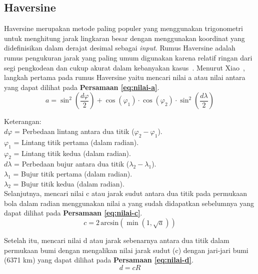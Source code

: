 \subsection{Haversine}
Haversine merupakan metode paling populer yang menggunakan trigonometri untuk menghitung jarak lingkaran besar dengan menggunakan koordinat yang didefinisikan dalam derajat desimal sebagai \textit{input}. Rumus Haversine adalah rumus pengukuran jarak yang paling umum digunakan karena relatif ringan dari segi pengkodean dan cukup akurat dalam kebanyakan kasus~\cite{learning2019joel}. Menurut Xiao~\cite{gis2015xiao}, langkah pertama pada rumus Haversine yaitu mencari nilai a atau nilai antara yang dapat dilihat pada \textbf{Persamaan \ref{eq:nilai-a}}.
\begin{equation}
    a = \sin^2 \left( \frac{d\varphi}{2} \right) + \cos(\varphi_1) \cdot \cos(\varphi_2) \cdot \sin^2 \left( \frac{d\lambda}{2} \right)
\label{eq:nilai-a}
\end{equation}


\noindent Keterangan:
\\
$d\varphi$ = Perbedaan lintang antara dua titik ($\varphi_2 - \varphi_1$).
\\
$\varphi_1$ = Lintang titik pertama (dalam radian).
\\
$\varphi_2$ = Lintang titik kedua (dalam radian).
\\
$d\lambda$ = Perbedaan bujur antara dua titik ($\lambda_2 - \lambda_1$).
\\
$\lambda_1$ = Bujur titik pertama (dalam radian).
\\
$\lambda_2$ = Bujur titik kedua (dalam radian).
\\

Selanjutnya, mencari nilai c atau jarak sudut antara dua titik pada permukaan bola dalam radian menggunakan nilai a yang sudah didapatkan sebelumnya yang dapat dilihat pada \textbf{Persamaan \ref{eq:nilai-c}}.
\begin{equation}
    c = 2 \, \text{arcsin} \left( \min(1, \sqrt{a}) \right)
\label{eq:nilai-c}
\end{equation}

Setelah itu, mencari nilai d atau jarak sebenarnya antara dua titik dalam permukaan bumi dengan mengalikan nilai jarak sudut (c) dengan jari-jari bumi (6371 km) yang dapat dilihat pada \textbf{Persamaan \ref{eq:nilai-d}}.
\begin{equation}
    d = cR
\label{eq:nilai-d}
\end{equation}

